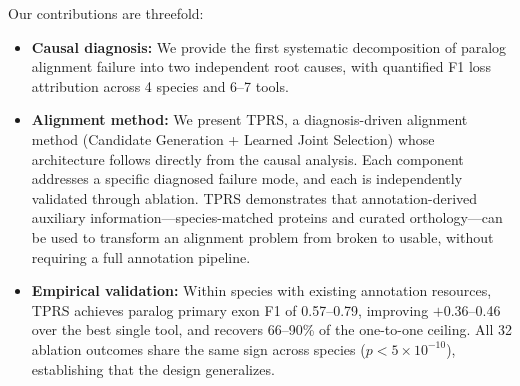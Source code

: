 Our contributions are threefold:
\begin{itemize}
\item \textbf{Causal diagnosis:} We provide the first systematic decomposition of paralog alignment failure into two independent root causes, with quantified F1 loss attribution across 4 species and 6--7 tools.
\item \textbf{Alignment method:} We present TPRS, a diagnosis-driven alignment method (Candidate Generation + Learned Joint Selection) whose architecture follows directly from the causal analysis. Each component addresses a specific diagnosed failure mode, and each is independently validated through ablation. TPRS demonstrates that annotation-derived auxiliary information---species-matched proteins and curated orthology---can be used to transform an alignment problem from broken to usable, without requiring a full annotation pipeline.
\item \textbf{Empirical validation:} Within species with existing annotation resources, TPRS achieves paralog primary exon F1 of 0.57--0.79, improving $+$0.36--0.46 over the best single tool, and recovers 66--90\% of the one-to-one ceiling. All 32 ablation outcomes share the same sign across species ($p < 5\times10^{-10}$), establishing that the design generalizes.
\end{itemize}
